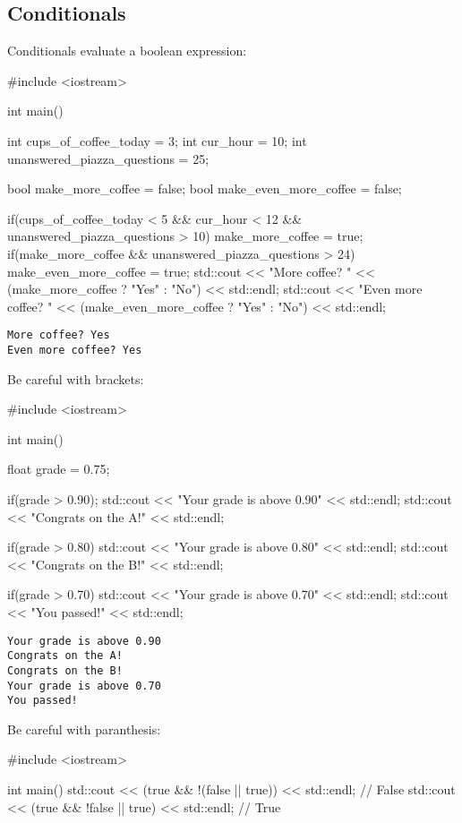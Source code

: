 \documentclass[12pt,letterpaper,twoside]{article}
\begin{document}
\subsection{Conditionals}

Conditionals evaluate a boolean expression:
\begin{cpp}
#include <iostream>

int main() {
  int cups_of_coffee_today = 3;
  int cur_hour = 10;
  int unanswered_piazza_questions = 25;

  bool make_more_coffee = false;
  bool make_even_more_coffee = false;

  if(cups_of_coffee_today < 5 && cur_hour < 12 && unanswered_piazza_questions > 10){
    make_more_coffee = true;
  }
  if(make_more_coffee && unanswered_piazza_questions > 24){
    make_even_more_coffee = true;
  }
  std::cout << "More coffee? " << (make_more_coffee ? "Yes" : "No") << std::endl;
  std::cout << "Even more coffee? " << (make_even_more_coffee ? "Yes" : "No") << std::endl;
}
\end{cpp}
\vspace{-3ex}
{\footnotesize
\begin{verbatim}
More coffee? Yes
Even more coffee? Yes
\end{verbatim}}

Be careful with brackets:
\begin{cpp}
#include <iostream>

int main() {
  float grade = 0.75;

  if(grade > 0.90);
    std::cout << "Your grade is above 0.90" << std::endl;
    std::cout << "Congrats on the A!" << std::endl;

  if(grade > 0.80)
    std::cout << "Your grade is above 0.80" << std::endl;
    std::cout << "Congrats on the B!" << std::endl;

  if(grade > 0.70){
    std::cout << "Your grade is above 0.70" << std::endl;
    std::cout << "You passed!" << std::endl;
  }
}
\end{cpp}
\vspace{-3ex}
{\footnotesize
\begin{verbatim}
Your grade is above 0.90
Congrats on the A!
Congrats on the B!
Your grade is above 0.70
You passed!
\end{verbatim}}

Be careful with paranthesis:
\begin{cpp}
#include <iostream>

int main() {
  std::cout << (true && !(false || true)) << std::endl; // False
  std::cout << (true && !false || true)  << std::endl;  // True
}
\end{cpp}
\end{document}
